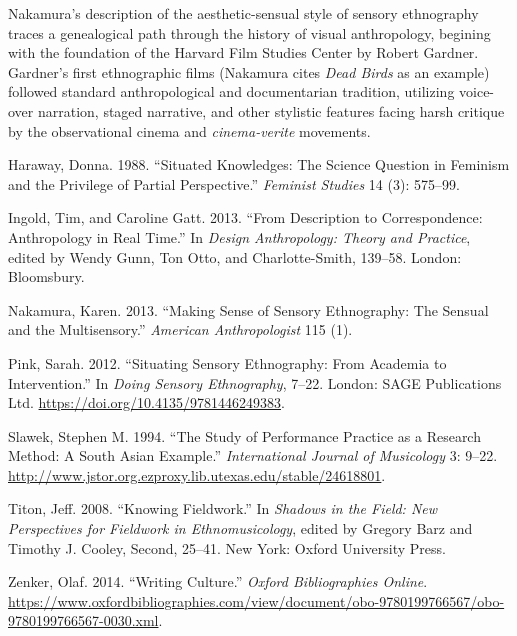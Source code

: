 Nakamura's description of the aesthetic-sensual style of sensory
ethnography traces a genealogical path through the history of visual
anthropology, begining with the foundation of the Harvard Film Studies
Center by Robert Gardner. Gardner's first ethnographic films (Nakamura
cites \emph{Dead Birds} as an example) followed standard anthropological
and documentarian tradition, utilizing voice-over narration, staged
narrative, and other stylistic features facing harsh critique by the
observational cinema and \emph{cinema-verite} movements.

\hypertarget{refs}{}
\begin{cslreferences}
\leavevmode\hypertarget{ref-haraway_situated_1988}{}%
Haraway, Donna. 1988. ``Situated Knowledges: The Science Question in
Feminism and the Privilege of Partial Perspective.'' \emph{Feminist
Studies} 14 (3): 575--99.

\leavevmode\hypertarget{ref-ingold_description_2013}{}%
Ingold, Tim, and Caroline Gatt. 2013. ``From Description to
Correspondence: Anthropology in Real Time.'' In \emph{Design
Anthropology: Theory and Practice}, edited by Wendy Gunn, Ton Otto, and
Charlotte-Smith, 139--58. London: Bloomsbury.

\leavevmode\hypertarget{ref-nakamura_making_2013}{}%
Nakamura, Karen. 2013. ``Making Sense of Sensory Ethnography: The
Sensual and the Multisensory.'' \emph{American Anthropologist} 115 (1).

\leavevmode\hypertarget{ref-pink_situating_2012}{}%
Pink, Sarah. 2012. ``Situating Sensory Ethnography: From Academia to
Intervention.'' In \emph{Doing Sensory Ethnography}, 7--22. London: SAGE
Publications Ltd. \url{https://doi.org/10.4135/9781446249383}.

\leavevmode\hypertarget{ref-slawek_study_1994}{}%
Slawek, Stephen M. 1994. ``The Study of Performance Practice as a
Research Method: A South Asian Example.'' \emph{International Journal of
Musicology} 3: 9--22.
\url{http://www.jstor.org.ezproxy.lib.utexas.edu/stable/24618801}.

\leavevmode\hypertarget{ref-titon_knowing_2008}{}%
Titon, Jeff. 2008. ``Knowing Fieldwork.'' In \emph{Shadows in the Field:
New Perspectives for Fieldwork in Ethnomusicology}, edited by Gregory
Barz and Timothy J. Cooley, Second, 25--41. New York: Oxford University
Press.

\leavevmode\hypertarget{ref-zenker_writing_2014}{}%
Zenker, Olaf. 2014. ``Writing Culture.'' \emph{Oxford Bibliographies
Online}.
\url{https://www.oxfordbibliographies.com/view/document/obo-9780199766567/obo-9780199766567-0030.xml}.
\end{cslreferences}
